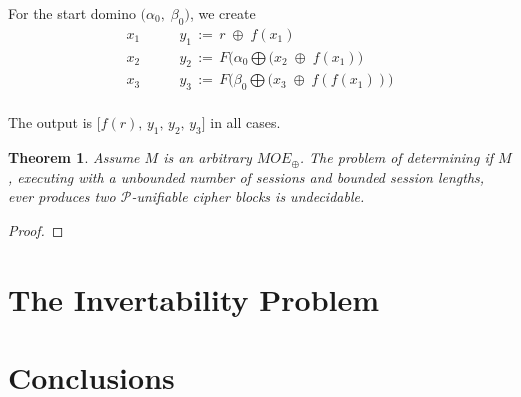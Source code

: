 \documentclass{easychair}
\newtheorem{theorem}{Theorem}
\begin{document}
For the start domino $\big( \alpha_0 , \; \beta_0 \big)$, we create
\[
\begin{array}{cl}
x_1 & \qquad y_1 \, := \, r \; \oplus \; f( x_1 ) \\[+10pt]
x_2 & \qquad y_2 \, := \, F(\alpha_0 \bigoplus( x_2  \; \oplus \;   f(x_1) \big)\\[+10pt]
x_3 & \qquad y_3 \, := \,  F(\beta_0 \bigoplus( x_3  \; \oplus \; f(f(x_1)) \big)\\[+10pt]
\end{array}
\]

The output is $\big[ f(r), \, y_1, \, y_2, \, y_3 \big]$ in all cases.


\begin{theorem}
	Assume $M$ is an arbitrary $MOE_{\oplus}$. The problem
	of determining if $M$, executing with 
	a unbounded number of sessions and bounded session
	lengths, ever produces two  $\mathcal{P}$-unifiable cipher blocks is undecidable. 
\end{theorem}
\begin{proof}

\end{proof}
\section{The Invertability Problem}

\section{Conclusions}



\end{document}
